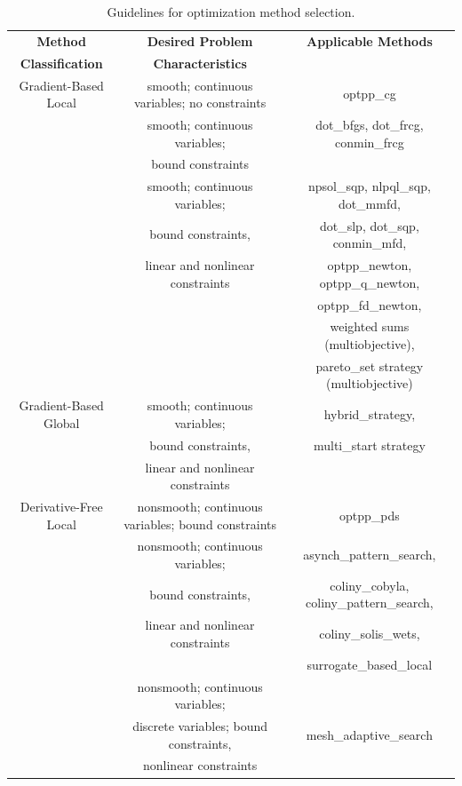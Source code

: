 \begin{table}[hbp]
\centering
\caption{Guidelines for optimization method selection.} 
\label{opt:usage:guideopt}\vspace{2mm}
\begin{tabular}{|c|c|c|}
\hline
\textbf{Method} & \textbf{Desired Problem} & \textbf{Applicable Methods} \\
\textbf{Classification} & \textbf{Characteristics} & \\
\hline
Gradient-Based Local & smooth; continuous variables; no constraints
& optpp\_cg \\
\hline
         & smooth; continuous variables; & dot\_bfgs, dot\_frcg, conmin\_frcg \\
         & bound constraints &  \\
\hline
         & smooth; continuous variables; & npsol\_sqp, nlpql\_sqp, dot\_mmfd, \\
         & bound constraints, & dot\_slp, dot\_sqp,
         conmin\_mfd, \\
         & linear and nonlinear constraints & optpp\_newton,
         optpp\_q\_newton, \\
         &          &optpp\_fd\_newton, \\
         &          & weighted sums (multiobjective), \\
         &          & pareto\_set strategy (multiobjective) \\
\hline
Gradient-Based Global & smooth; continuous variables; & hybrid\_strategy, \\
         &  bound constraints, & multi\_start strategy \\
         &  linear and nonlinear constraints & \\
\hline
Derivative-Free Local & nonsmooth; continuous variables; bound constraints
& optpp\_pds \\
\hline
         & nonsmooth; continuous variables; & asynch\_pattern\_search, \\
         & bound constraints, & coliny\_cobyla, coliny\_pattern\_search, \\
         & linear and nonlinear constraints & coliny\_solis\_wets, \\
         &          & surrogate\_based\_local \\
\hline
         & nonsmooth; continuous variables; &  \\
         & discrete variables; bound constraints, & mesh\_adaptive\_search \\
         & nonlinear constraints &  \\

\end{tabular}
\end{table}
